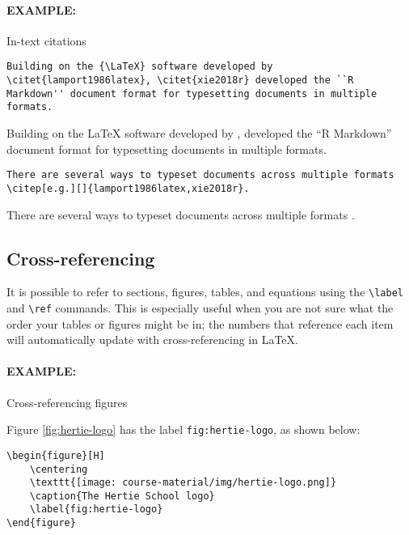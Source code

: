 \documentclass[11pt]{article}
\begin{document}
\newpage
\paragraph{EXAMPLE:} In-text citations

\begin{lstlisting}
Building on the {\LaTeX} software developed by \citet{lamport1986latex}, \citet{xie2018r} developed the ``R Markdown'' document format for typesetting documents in multiple formats.
\end{lstlisting}

\noindent Building on the {\LaTeX} software developed by \citet{lamport1986latex}, \citet{xie2018r} developed the ``R Markdown'' document format for typesetting documents in multiple formats.

\begin{lstlisting}
There are several ways to typeset documents across multiple formats \citep[e.g.][]{lamport1986latex,xie2018r}.
\end{lstlisting}

\noindent There are several ways to typeset documents across multiple formats \citep[e.g.][]{lamport1986latex,xie2018r}.

\subsection*{Cross-referencing}

It is possible to refer to sections, figures, tables, and equations using the \verb|\label| and \verb|\ref| commands. This is especially useful when you are not sure what the order your tables or figures might be in; the numbers that reference each item will automatically update with cross-referencing in {\LaTeX}.

\paragraph{EXAMPLE:} Cross-referencing figures

\noindent Figure \ref{fig:hertie-logo} has the label \verb|fig:hertie-logo|, as shown below:

\begin{lstlisting}
\begin{figure}[H]
    \centering
    \texttt{[image: course-material/img/hertie-logo.png]}
    \caption{The Hertie School logo}
    \label{fig:hertie-logo}
\end{figure}
\end{lstlisting}
\end{document}
